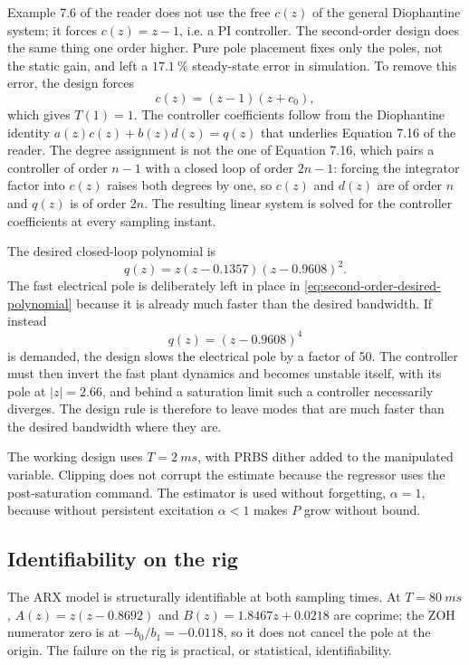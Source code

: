 Example 7.6 of the reader does not use the free \(c(z)\) of the general
Diophantine system; it forces \(c(z)=z-1\), i.e. a PI controller. The
second-order design does the same thing one order higher. Pure pole placement
fixes only the poles, not the static gain, and left a
\(\SI{17.1}{\percent}\) steady-state error in simulation. To remove this error,
the design forces
\begin{equation}
  c(z)=(z-1)(z+c_0),
  \label{eq:second-order-integrator}
\end{equation}
which gives \(T(1)=1\). The controller coefficients follow from the Diophantine
identity \(a(z)c(z)+b(z)d(z)=q(z)\) that underlies Equation 7.16 of the reader.
The degree assignment is not the one of Equation 7.16, which pairs a controller
of order \(n-1\) with a closed loop of order \(2n-1\): forcing the integrator
factor into \(c(z)\) raises both degrees by one, so \(c(z)\) and \(d(z)\) are of
order \(n\) and \(q(z)\) is of order \(2n\). The resulting linear system is
solved for the controller coefficients at every sampling instant.

The desired closed-loop polynomial is
\begin{equation}
  q(z)=z(z-0.1357)(z-0.9608)^2 .
  \label{eq:second-order-desired-polynomial}
\end{equation}
The fast electrical pole is deliberately left in place in
\eqref{eq:second-order-desired-polynomial} because it is already much faster
than the desired bandwidth. If instead
\[
  q(z)=(z-0.9608)^4
\]
is demanded, the design slows the electrical pole by a factor of \(50\). The
controller must then invert the fast plant dynamics and becomes unstable
itself, with its pole at \(|z|=2.66\), and behind a saturation limit such a
controller necessarily diverges. The design rule is therefore to leave modes
that are much faster than the desired bandwidth where they are.

The working design uses \(T=\SI{2}{ms}\), with PRBS dither added to the
manipulated variable. Clipping does not corrupt the estimate because the
regressor uses the post-saturation command. The estimator is used without
forgetting, \(\alpha=1\), because without persistent excitation \(\alpha<1\)
makes \(P\) grow without bound.

\subsection{Identifiability on the rig}\label{sec:identifiability}

The ARX model is structurally identifiable at both sampling times. At
\(T=\SI{80}{ms}\), \(A(z)=z(z-0.8692)\) and
\(B(z)=1.8467z+0.0218\) are coprime; the ZOH numerator zero is at
\(-b_0/b_1=-0.0118\), so it does not cancel the pole at the origin. The
failure on the rig is practical, or statistical, identifiability.

